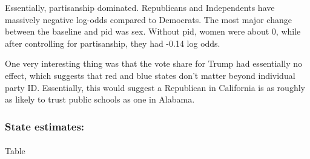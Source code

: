 \documentclass[
  letterpaper,
  DIV=11,
  numbers=noendperiod]{scrartcl}
\makeatletter
\let\oldparagraph\paragraph
\renewcommand{\paragraph}{
    \@ifstar
      \xxxParagraphStar
      \xxxParagraphNoStar
  }
\newcommand{\xxxParagraphStar}[1]{\oldparagraph*{#1}\mbox{}}
\newcommand{\xxxParagraphNoStar}[1]{\oldparagraph{#1}\mbox{}}
\makeatother
\begin{document}
Essentially, partisanship dominated. Republicans and Independents have
massively negative log-odds compared to Democrats. The most major change
between the baseline and pid was sex. Without pid, women were about 0,
while after controlling for partisanship, they had -0.14 log odds.

One very interesting thing was that the vote share for Trump had
essentially no effect, which suggests that red and blue states don't
matter beyond individual party ID. Essentially, this would suggest a
Republican in California is as roughly as likely to trust public schools
as one in Alabama.

\subsubsection{State estimates:}\label{state-estimates}

\paragraph{Table}\label{table}
\end{document}
